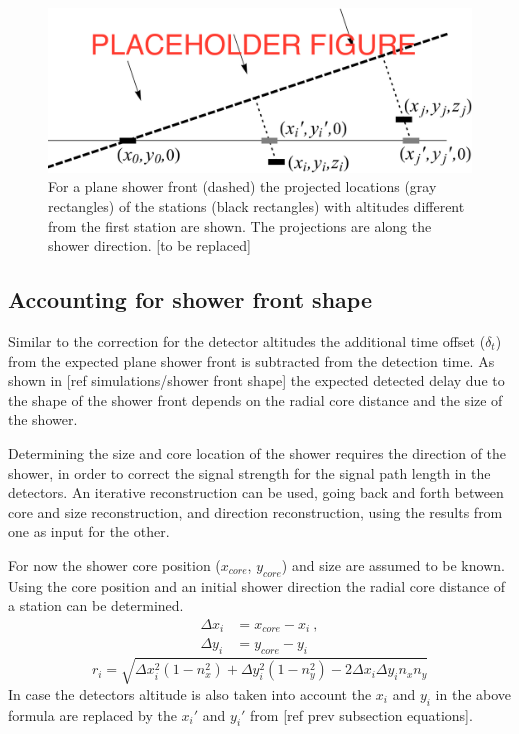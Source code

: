\begin{figure}
    \centering
    \includegraphics[width=0.7\linewidth]{plots/reconstructions/approxfront.pdf}
    \caption{For a plane shower front (dashed) the projected locations (gray rectangles) of the stations (black rectangles) with altitudes different from the first station are shown. The projections are along the shower direction. [to be replaced]}
    \label{fig:altitude_projection}
\end{figure}


\subsection{Accounting for shower front shape}

Similar to the correction for the detector altitudes the additional time offset ($\delta_t$) from the expected plane shower front is subtracted from the detection time.  As shown in [ref simulations/shower front shape] the expected detected delay due to the shape of the shower front depends on the radial core distance and the size of the shower.

Determining the size and core location of the shower requires the direction of the shower, in order to correct the signal strength for the signal path length in the detectors. An iterative reconstruction can be used, going back and forth between core and size reconstruction, and direction reconstruction, using the results from one as input for the other.

For now the shower core position ($x_{core}$, $y_{core}$) and size are assumed to be known. Using the core position and an initial shower direction the radial core distance of a station can be determined.
%
\begin{equation}
    \begin{aligned}
        \Delta x_i &= x_{core} - x_i \ , \\
        \Delta y_i &= y_{core} - y_i
    \end{aligned}
\end{equation}
%
\begin{equation}
    r_i = \sqrt{\Delta x_i^2 (1 - n_x^2) + \Delta y_i^2 (1 - n_y^2) -
                2 \Delta x_i \Delta y_i n_x n_y}
\end{equation}
%
In case the detectors altitude is also taken into account the $x_i$ and $y_i$ in the above formula are replaced by the $x_i'$ and $y_i'$ from [ref prev subsection equations].

